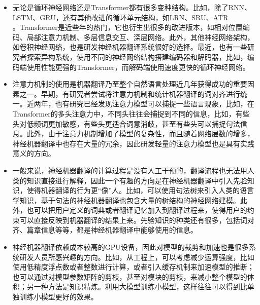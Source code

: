 \begin{itemize}
\vspace{0.5em}
\item 无论是循环神经网络还是Transformer都有很多变种结构。比如，除了RNN、\\LSTM、GRU，还有其他改进的循环单元结构，如LRN\cite{DBLP:journals/corr/abs-1905-13324}、SRU\cite{Lei2017TrainingRA}、ATR\cite{Zhang2018SimplifyingNM}\\。Transformer是近些年的热门，它也衍生出很多的改进版本，如相对位置编码\cite{Shaw2018SelfAttentionWR}、局部注意力机制\cite{DBLP:journals/corr/abs-1904-03107}、多层信息交互\cite{wang-etal-2018-multi-layer}、深层网络\cite{WangLearning}。此外，其他神经网络架构，如卷积神经网络，也是研发神经机器翻译系统很好的选择\cite{DBLP:journals/corr/GehringAGYD17}\cite{Wu2019PayLA}。最近，也有一些研究者探索异构系统，使用不同的神经网络结构搭建编码器和解码器\cite{Chen2018TheBO}，比如，编码端使用性能更强的Transformer，而解码端使用速度更快的循环神经网络。
\vspace{0.5em}
\item 注意力机制的使用是机器翻译乃至整个自然语言处理近几年获得成功的重要因素之一\cite{Liu_2019_CVPR}\cite{DBLP:journals/corr/abs-1811-00498}\cite{MoradiInterrogating}。早期，有研究者尝试将注意力机制和统计机器翻译的词对齐进行统一\cite{WangNeural}。近两年，也有研究已经发现注意力模型可以捕捉一些语言现象\cite{DBLP:journals/corr/abs-1905-09418}，比如，在Transformer的多头注意力中，不同头往往会捕捉到不同的信息，比如，有些头对低频词更加敏感，有些头更适合词意消歧，甚至有些头可以捕捉句法信息。此外，由于注意力机制增加了模型的复杂性，而且随着网络层数的增多，神经机器翻译中也存在大量的冗余，因此研发轻量的注意力模型也是具有实践意义的方向\cite{Xiao2019SharingAW}。
\vspace{0.5em}
\item 一般来说，神经机器翻译的计算过程是没有人工干预的，翻译流程也无法用人类的知识直接进行解释，因此一个有趣的方向是在神经机器翻译中引入先验知识，使得机器翻译的行为更``像''人。比如，可以使用句法树来引入人类的语言学知识\cite{Yang2017TowardsBH,Wang2019TreeTI}，基于句法的神经机器翻译也包含大量的树结构的神经网络建模\cite{DBLP:journals/corr/abs-1809-01854,DBLP:journals/corr/abs-1808-09374}。此外，也可以把用户定义的词典或者翻译记忆加入到翻译过程来\cite{DBLP:journals/corr/ZhangZ16c,Dai2019TransformerXLAL}，使得用户的约束可以直接反映到机器翻译的结果上来。先验知识的种类还有很多，包括词对齐\cite{li-etal-2019-word,Zhang2017PriorKI}、篇章信息\cite{Werlen2018DocumentLevelNM,DBLP:journals/corr/abs-1805-10163}等等，都是神经机器翻译中能够使用的信息。
\vspace{0.5em}
\item 神经机器翻译依赖成本较高的GPU设备，因此对模型的裁剪和加速也是很多系统研发人员所感兴趣的方向。比如，从工程上，可以考虑减少运算强度，比如使用低精度浮点数或者整数进行计算，或者引入缓存机制来加速模型的推断\cite{DBLP:journals/corr/abs-1906-00532,DBLP:journals/corr/CourbariauxB16}；也可以通过对模型参数矩阵的剪枝，甚至对模块的剪枝，来减小整个模型的体积\cite{Zhang2018SpeedingUN,DBLP:journals/corr/SeeLM16}；另一种方法是知识精炼。利用大模型训练小模型，这样往往可以得到比单独训练小模型更好的效果\cite{DBLP:journals/corr/ChenLCL17,Hinton2015Distilling,Sun2019PatientKD}。
\vspace{0.5em}
\end{itemize}












